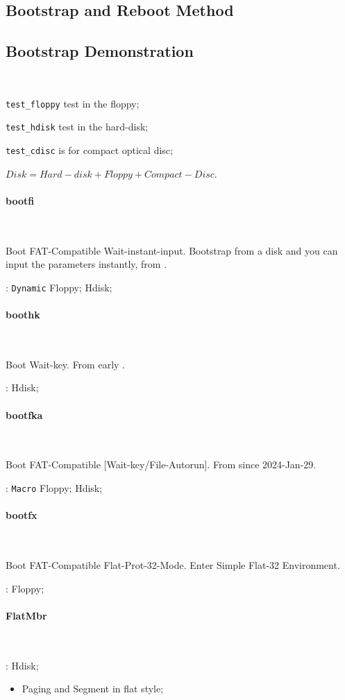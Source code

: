 \subsection{Bootstrap and Reboot Method}


\subsection{Bootstrap Demonstration} \

\verb`test_floppy` test in the floppy;

\verb`test_hdisk` test in the hard-disk;

\verb`test_cdisc` is  for compact optical disc;

$Disk = Hard-disk + Floppy + Compact-Disc$.

\paragraph{bootfi} \

Boot FAT-Compatible Wait-instant-input. Bootstrap from a disk and you can input the parameters instantly, from .

: \verb|Dynamic| Floppy; Hdisk;

\paragraph{boothk}\ %

Boot Wait-key. From early .

: Hdisk;

\paragraph{bootfka}\

Boot FAT-Compatible [Wait-key/File-Autorun]. From  since 2024-Jan-29.

: \verb`Macro` Floppy; Hdisk;

\paragraph{bootfx}\

Boot FAT-Compatible Flat-Prot-32-Mode. Enter Simple Flat-32 Environment.

: Floppy;

\paragraph{FlatMbr}\


: Hdisk;

\begin{itemize}
	\item Paging and Segment in flat style;
\end{itemize}

